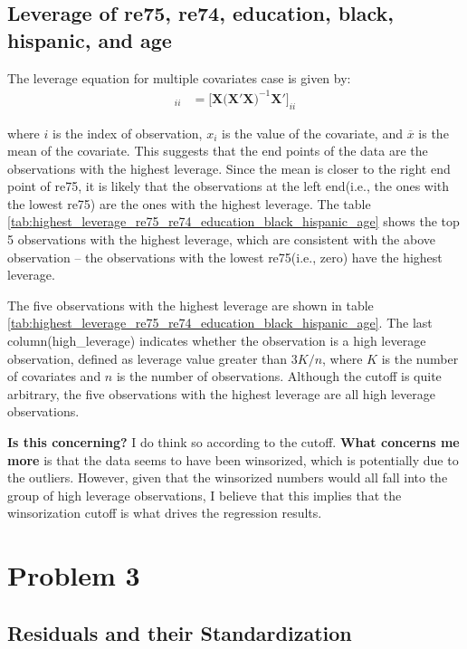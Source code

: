 \documentclass[12pt]{article}
\begin{document}
\subsection{Leverage of re75, re74, education, black, hispanic, and age}

The leverage equation for multiple covariates case is given by:
\begin{align}
    [\mathbf{H}]_{ii} &= \biggl[\mathbf{X}\bigl(\mathbf{X}'\mathbf{X}\bigr)^{-1}\mathbf{X}'\biggr]_{ii}
\end{align}

where $i$ is the index of observation, $x_i$ is the value of the covariate, and $\overline{x}$ is the mean of the covariate.
This suggests that the end points of the data are the observations with the highest leverage.
Since the mean is closer to the right end point of re75, it is likely that the observations at the left end(i.e., the ones with the lowest re75) are the ones with the highest leverage.
The table \ref{tab:highest_leverage_re75_re74_education_black_hispanic_age} shows the top 5 observations with the highest leverage, which are consistent with the above observation – the observations with the lowest re75(i.e., zero) have the highest leverage.

The five observations with the highest leverage are shown in table \ref{tab:highest_leverage_re75_re74_education_black_hispanic_age}. 
The last column(high\_leverage) indicates whether the observation is a high leverage observation, defined as leverage value greater than $3K/n$, where $K$ is the number of covariates and $n$ is the number of observations.
Although the cutoff is quite arbitrary, the five observations with the highest leverage are all high leverage observations.

\textbf{Is this concerning?} I do think so according to the cutoff. \textbf{What concerns me more} is that the data seems to have been winsorized, which is potentially due to the outliers.
However, given that the winsorized numbers would all fall into the group of high leverage observations, I believe that this implies that the winsorization cutoff is what drives the regression results.




\section{Problem 3}

\subsection{Residuals and their Standardization}
\end{document}
